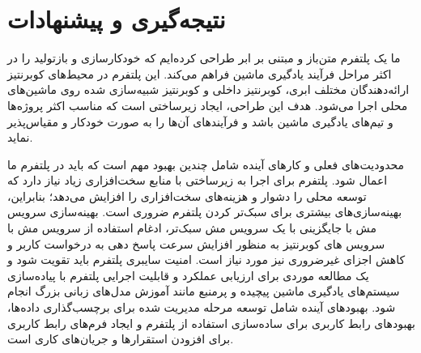 \chapter{نتیجه‌گیری و پیشنهادات} \label{ch:Conclusion}

ما یک پلتفرم  متن‌باز و مبتنی بر ابر طراحی کرده‌ایم که خودکارسازی و بازتولید را در اکثر مراحل فرآیند یادگیری ماشین فراهم می‌کند. این پلتفرم در محیط‌های کوبرنتیز ارائه‌دهندگان مختلف ابری، کوبرنتیز داخلی و کوبرنتیز شبیه‌سازی شده روی ماشین‌های محلی اجرا می‌شود. هدف این طراحی، ایجاد زیرساختی است که مناسب اکثر پروژه‌ها و تیم‌های یادگیری ماشین باشد و فرآیندهای آن‌ها را به صورت خودکار و مقیاس‌پذیر نماید. 

محدودیت‌های فعلی و کارهای آینده شامل چندین بهبود مهم است که باید در پلتفرم  ما اعمال شود. پلتفرم برای اجرا به زیرساختی با منابع سخت‌افزاری زیاد نیاز دارد که توسعه محلی را دشوار و هزینه‌های سخت‌افزاری را افزایش می‌دهد؛ بنابراین، بهینه‌سازی‌های بیشتری برای سبک‌تر کردن پلتفرم ضروری است. بهینه‌سازی سرویس مش با جایگزینی  با یک سرویس مش سبک‌تر، ادغام استفاده از سرویس مش با سرویس های کوبرنتیز به منظور افزایش سرعت پاسخ دهی به درخواست کاربر و کاهش اجزای غیرضروری  نیز مورد نیاز است. امنیت سایبری پلتفرم باید تقویت شود و یک مطالعه موردی برای ارزیابی عملکرد و قابلیت اجرایی پلتفرم با پیاده‌سازی سیستم‌های یادگیری ماشین پیچیده و پرمنبع مانند آموزش مدل‌های زبانی بزرگ انجام شود. بهبودهای آینده شامل توسعه مرحله مدیریت شده برای برچسب‌گذاری داده‌ها، بهبودهای رابط کاربری برای ساده‌سازی استفاده از پلتفرم و ایجاد فرم‌های رابط کاربری برای افزودن استقرارها و جریان‌های کاری است.
